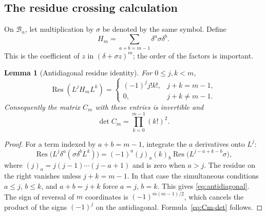 \documentclass[11pt,a4paper]{article}
\numberwithin{equation}{section}
\newtheorem{lemma}[theorem]{Lemma}
\theoremstyle{definition}
\theoremstyle{remark}
\theoremstyle{definition}
\newcommand{\Bb}{\mathcal B}
\newcommand{\Res}{\operatorname{Res}}
\begin{document}
\subsection{The residue crossing calculation}
On $\Bb_n$, let multiplication by $\sigma$ be denoted by the same symbol. Define
\begin{equation}
 H_m=\sum_{a+b=m-1}\delta^a\sigma\delta^b.
 \label{eq:Hm}
\end{equation}
This is the coefficient of $z$ in $(\delta+\sigma z)^m$; the order of the factors is important.

\begin{lemma}[Antidiagonal residue identity]
\label{lem:crossing}
For $0\le j,k<m$,
\begin{equation}
 \Res(L^jH_mL^k)=
 \begin{cases}
 (-1)^j j!k!,&j+k=m-1,\\
 0,&j+k\ne m-1.
 \end{cases}
 \label{eq:antidiagonal}
\end{equation}
Consequently the matrix $C_m$ with these entries is invertible and
\begin{equation}
 \det C_m=\prod_{k=0}^{m-1}(k!)^2.
 \label{eq:Cm-det}
\end{equation}
\end{lemma}
\begin{proof}
For a term indexed by $a+b=m-1$, integrate the $a$ derivatives onto $L^j$:
\[
 \Res\bigl(L^j\delta^a(\sigma\delta^bL^k)\bigr)
 =(-1)^a(j)_a(k)_b\Res\bigl(L^{j-a+k-b}\sigma\bigr),
\]
where $(j)_a=j(j-1)\cdots(j-a+1)$ and is zero when $a>j$. The residue on the right vanishes unless $j+k=m-1$. In that case the simultaneous conditions $a\le j$, $b\le k$, and $a+b=j+k$ force $a=j$, $b=k$. This gives \eqref{eq:antidiagonal}. The sign of reversal of $m$ coordinates is $(-1)^{m(m-1)/2}$, which cancels the product of the signs $(-1)^j$ on the antidiagonal. Formula~\eqref{eq:Cm-det} follows.
\end{proof}
\end{document}
